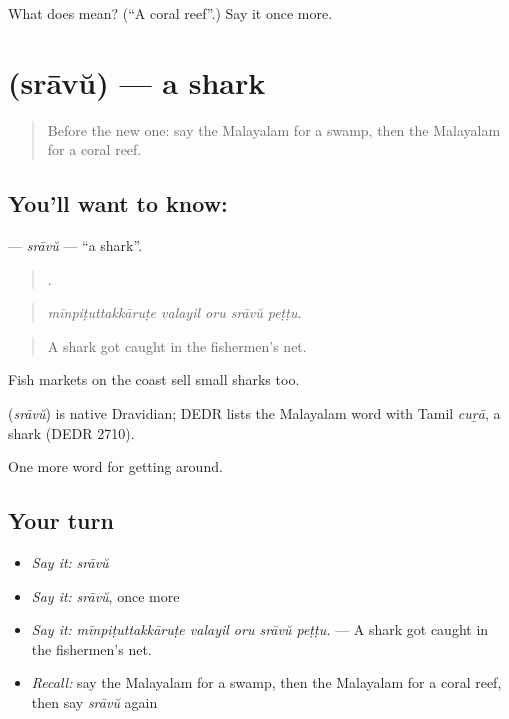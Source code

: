 \begin{tcolorbox}[breakable,colback=teal!4,colframe=teal!35!black,title={Before you move on}]
What does  mean? (\textquotedblleft{}A coral reef\textquotedblright{}.) Say it once more.
\end{tcolorbox}
\section[\texorpdfstring{\ml{സ്രാവ്} (srāvŭ)}{സ്രാവ് (srāvŭ)}]{ (srāvŭ) — a shark}

\label{lesson:ML-C498-sravu}



\begin{quote}
Before the new one: say the Malayalam for a swamp, then the Malayalam for a coral reef.
\end{quote}

\subsection*{You'll want to know: }
\textbf{} — \emph{srāvŭ} — \textquotedblleft{}a shark\textquotedblright{}.

\begin{quote}
    .
\end{quote}

\begin{quote}
\emph{mīnpiṭuttakkāruṭe valayil oru srāvŭ peṭṭu.}
\end{quote}

\begin{quote}
A shark got caught in the fishermen's net.
\end{quote}

Fish markets on the coast sell small sharks too.

\begin{cousinweb}
\textbf{} (\emph{srāvŭ}) is native Dravidian; DEDR lists the Malayalam word with Tamil \emph{cuṟā}, a shark (DEDR 2710).
\end{cousinweb}

\begin{grammarlens}[title={What you've built}]
One more word for getting around.
\end{grammarlens}

\subsection*{Your turn}
\begin{itemize}
\raggedright
  \item \emph{Say it:} \emph{srāvŭ}
  \item \emph{Say it:} \emph{srāvŭ}, once more
  \item \emph{Say it:} \emph{mīnpiṭuttakkāruṭe valayil oru srāvŭ peṭṭu.} — A shark got caught in the fishermen's net.
  \item \emph{Recall:} say the Malayalam for a swamp, then the Malayalam for a coral reef, then say \emph{srāvŭ} again
\end{itemize}

